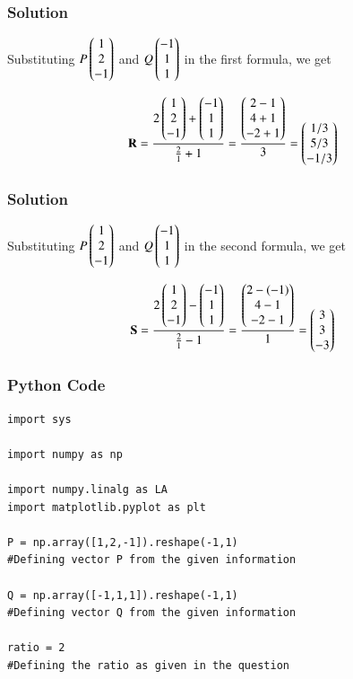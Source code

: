 \documentclass{beamer}
\begin{document}
\begin{frame}

\frametitle{Solution}

    Substituting $P\begin{pmatrix} 1 \\ 2\\ -1\end{pmatrix}$ and $Q\begin{pmatrix} -1 \\ 1\\ 1\end{pmatrix}$ in the first formula, we get \vspace{0.5cm}

\begin{align}
    \mathbf{R}=\frac{2\begin{pmatrix} 1 \\ 2\\ -1\end{pmatrix}+\begin{pmatrix} -1 \\ 1\\ 1\end{pmatrix}}{\frac{2}{1}+1} = \frac{\begin{pmatrix} 2-1 \\ 4+1\\ -2+1\end{pmatrix}}{3} = \begin{pmatrix} 1/3\\ 5/3\\ -1/3\end{pmatrix}
\end{align}


\end{frame}


\begin{frame}


\frametitle{Solution}
Substituting $P\begin{pmatrix} 1 \\ 2\\ -1\end{pmatrix}$ and $Q\begin{pmatrix} -1 \\ 1\\ 1\end{pmatrix}$ in the second formula, we get  \vspace{0.5cm}

\begin{align}
    \mathbf{S}=\frac{2\begin{pmatrix} 1 \\ 2\\ -1\end{pmatrix}-\begin{pmatrix} -1 \\ 1\\ 1\end{pmatrix}}{\frac{2}{1}-1} = \frac{\begin{pmatrix} 2-(-1) \\ 4-1\\ -2-1\end{pmatrix}}{1} = \begin{pmatrix} 3\\ 3\\ -3\end{pmatrix}
\end{align}
\end{frame}




\begin{frame}[fragile]
    \frametitle{Python Code}
    \begin{lstlisting}
import sys

import numpy as np

import numpy.linalg as LA
import matplotlib.pyplot as plt

P = np.array([1,2,-1]).reshape(-1,1)
#Defining vector P from the given information

Q = np.array([-1,1,1]).reshape(-1,1) 
#Defining vector Q from the given information

ratio = 2
#Defining the ratio as given in the question

    \end{lstlisting}
\end{frame}
\end{document}
